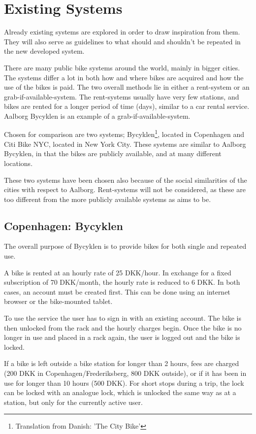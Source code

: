 \section{Existing Systems}

Already existing systems are explored in order to draw inspiration from them.
They will also serve as guidelines to what should and shouldn't be repeated in the new developed system.

There are many public bike systems around the world, mainly in bigger cities.
The systems differ a lot in both how and where bikes are acquired and how the use of the bikes is paid.
The two overall methods lie in either a rent-system or an grab-if-available-system.
The rent-systems usually have very few stations, and bikes are rented for a longer period of time (days), similar to a car rental service.
Aalborg Bycyklen is an example of a grab-if-available-system.

Chosen for comparison are two systems; Bycyklen\footnote{Translation from Danish: 'The City Bike'}, located in Copenhagen and Citi Bike NYC, located in New York City.
These systems are similar to Aalborg Bycyklen, in that the bikes are publicly available, and at many different locations.

These two systems have been chosen also because of the social similarities of the cities with respect to Aalborg.
Rent-systems will not be considered, as these are too different from the more publicly available systems as \citybike aims to be.

\subsection{Copenhagen: Bycyklen}
The overall purpose of Bycyklen\cite{cph_bycyklen}\cite{cph_bycyklen_conditions} is to provide bikes for both single and repeated use.

A bike is rented at an hourly rate of 25 DKK/hour.
In exchange for a fixed subscription of 70 DKK/month, the hourly rate is reduced to 6 DKK.
In both cases, an account must be created first.
This can be done using an internet browser or the bike-mounted tablet.

To use the service the user has to sign in with an existing account.
The bike is then unlocked from the rack and the hourly charges begin.
Once the bike is no longer in use and placed in a rack again, the user is logged out and the bike is locked.

If a bike is left outside a bike station for longer than 2 hours, fees are charged (200 DKK in Copenhagen/Frederiksberg, 800 DKK outside), or if it has been in use for longer than 10 hours (500 DKK).
For short stops during a trip, the lock can be locked with an analogue lock, which is unlocked the same way as at a station, but only for the currently active user.

